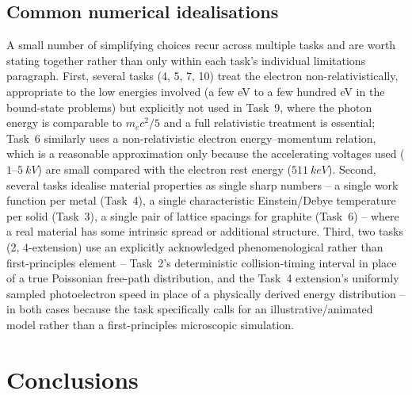 \documentclass[11pt]{article}
\begin{document}
\subsection{Common numerical idealisations}
A small number of simplifying choices recur across multiple tasks and are worth stating together rather than only within each task's individual limitations paragraph. First, several tasks (4, 5, 7, 10) treat the electron non-relativistically, appropriate to the low energies involved (a few eV to a few hundred eV in the bound-state problems) but explicitly not used in Task~9, where the photon energy is comparable to $m_ec^2/5$ and a full relativistic treatment is essential; Task~6 similarly uses a non-relativistic electron energy--momentum relation, which is a reasonable approximation only because the accelerating voltages used ($1$--$\SI{5}{kV}$) are small compared with the electron rest energy ($\SI{511}{keV}$). Second, several tasks idealise material properties as single sharp numbers -- a single work function per metal (Task~4), a single characteristic Einstein/Debye temperature per solid (Task~3), a single pair of lattice spacings for graphite (Task~6) -- where a real material has some intrinsic spread or additional structure. Third, two tasks (2, 4-extension) use an explicitly acknowledged phenomenological rather than first-principles element -- Task~2's deterministic collision-timing interval in place of a true Poissonian free-path distribution, and the Task~4 extension's uniformly sampled photoelectron speed in place of a physically derived energy distribution -- in both cases because the task specifically calls for an illustrative/animated model rather than a first-principles microscopic simulation.

\section{Conclusions}
\label{sec:conclusions}
\end{document}
